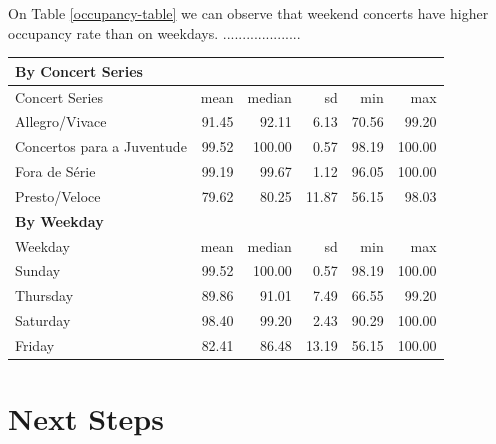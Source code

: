 \documentclass[a4paper, 12pt, openright, oneside, german, french, brazil, english]{abntex2}
\begin{document}
       On Table \ref{occupancy-table} we can observe that weekend concerts have higher occupancy rate than on weekdays. ....................

       \begin{table}[ht]
         {\begin{tabular}{lrrrrr}
            \hline
            \multicolumn{6}{l}{\textbf{By Concert Series}} \\
            \hline
            Concert Series & mean & median & sd & min & max \\ 
            \hline
            Allegro/Vivace & 91.45 & 92.11 & 6.13 & 70.56 & 99.20 \\ 
            Concertos para a Juventude & 99.52 & 100.00 & 0.57 & 98.19 & 100.00 \\
            Fora de Série & 99.19 & 99.67 & 1.12 & 96.05 & 100.00 \\
            Presto/Veloce & 79.62 & 80.25 & 11.87 & 56.15 & 98.03 \\
            \hline
            \multicolumn{6}{l}{\textbf{By Weekday}} \\
            \hline
            Weekday & mean & median & sd & min & max \\
            \hline
            Sunday & 99.52 & 100.00 & 0.57 & 98.19 & 100.00 \\ 
            Thursday & 89.86 & 91.01 & 7.49 & 66.55 & 99.20 \\ 
            Saturday & 98.40 & 99.20 & 2.43 & 90.29 & 100.00 \\ 
            Friday & 82.41 & 86.48 & 13.19 & 56.15 & 100.00 \\ 
            \hline
          \end{tabular}
        }
        {}
      \end{table}
      










        \chapter{Next Steps}
\end{document}
